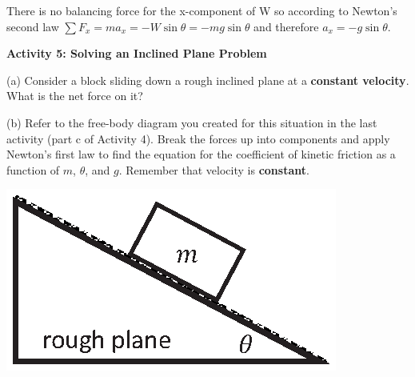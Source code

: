 There is no balancing force for the x-component of W so according to Newton's
second law \( \sum F_{x}  = ma_{x} = -W \sin \theta
= - mg \sin \theta  \) and therefore \( a_{x} = - g \sin \theta  \).

\textbf{Activity 5: Solving an Inclined Plane Problem} 

(a) Consider a block sliding down a rough inclined plane at a \textbf{constant velocity}. What is the net force on it?
\vspace{20mm}

(b) Refer to the free-body diagram you created for this situation in the last
activity (part c of Activity 4). Break the forces up into components and apply Newton's first law to
find the equation for the coefficient of kinetic friction as a function of $m$,
\( \theta  \), and $g$. Remember that velocity is \textbf{constant}.

\vspace{0.3cm}
{\par\centering \includegraphics{friction/rough_plane.eps} \par}
\vspace{0.3cm}

